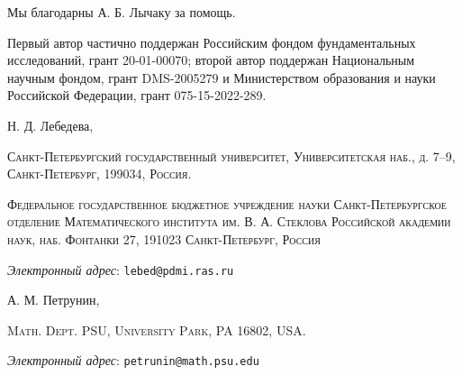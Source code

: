 \documentclass{article}
\def\parbf#1{\medskip\noindent{\bf #1}}
\begin{document}
\parbf{Благодарности.}
Мы благодарны А. Б. Лычаку за помощь. 

Первый автор частично поддержан Российским фондом фундаментальных исследований, грант 20-01-00070;
второй автор поддержан Национальным научным фондом, грант DMS-2005279
и
Министерством образования и науки Российской Федерации, грант 075-15-2022-289.

{\sloppy
\printbibliography[heading=bibintoc]
\fussy
}

{\bigskip\footnotesize

\noindent Н. Д. Лебедева,
\par\nopagebreak
 \textsc{Санкт-Петербургский государственный университет, Университетская наб., д. 7–9, Санкт-Петербург, 199034, Россия.}
\par
\nopagebreak
 \textsc{Федеральное  государственное  бюджетное  учреждение  науки
Санкт-Петербургское  отделение  Математического  института
им. В. А. Стеклова  Российской  академии  наук, наб. Фонтанки 27,
191023 Санкт-Петербург,
Россия }
  \par\nopagebreak
  \textit{Электронный адрес}: \texttt{lebed@pdmi.ras.ru}

\medskip

\noindent   А. М. Петрунин, 
\par\nopagebreak
 \textsc{Math. Dept. PSU, University Park, PA 16802, USA.}
  \par\nopagebreak
  \textit{Электронный адрес}: \texttt{petrunin@math.psu.edu}
  
}
\end{document}
